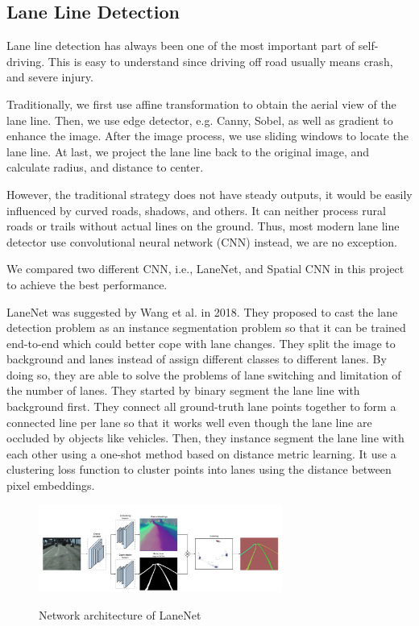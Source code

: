 \documentclass[runningheads]{llncs}
\begin{document}
\subsection{Lane Line Detection}
Lane line detection has always been one of the most 
important part of self-driving. This is easy to understand 
since driving off road usually means crash, and severe 
injury. 

Traditionally, we first use affine transformation to obtain 
the aerial view of the lane line. Then, we use edge 
detector, e.g. Canny, Sobel, as well as gradient to enhance 
the image. After the image process, we use sliding windows 
to locate the lane line. At last, we project the lane line 
back to the original image, and calculate radius, and 
distance to center. 

However, the traditional strategy does not have steady 
outputs, it would be easily influenced by curved roads, 
shadows, and others. It can neither process rural roads or 
trails without actual lines on the ground. Thus, most 
modern lane line detector use convolutional neural network 
(CNN) instead, we are no exception. 

We compared two different CNN, i.e., LaneNet, and 
Spatial CNN in this project to achieve the best performance. 

LaneNet was suggested by Wang et al.\cite{LaneNet} in 2018. 
They proposed to cast the lane detection problem as an 
instance segmentation problem so that it can be trained 
end-to-end which could better cope with lane changes. 
They split the image to background and lanes instead of 
assign different classes to different lanes. By doing so, 
they are able to solve the problems of lane switching and 
limitation of the number of lanes. They started by binary 
segment the lane line with background first. They connect 
all ground-truth lane points together to form a connected 
line per lane so that it works well even though the lane 
line are occluded by objects like vehicles. Then, they 
instance segment the lane line with each other using a 
one-shot method based on distance metric learning. It use a 
clustering loss function to cluster points into lanes using 
the distance between pixel embeddings.
 
\begin{figure}
    \centering
    \includegraphics[width=8cm]{reference/lanenet}
    \label{fig:example}
    \caption{Network architecture of LaneNet}
\end{figure}
\end{document}
